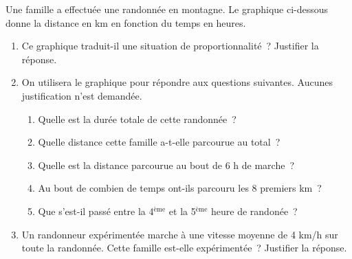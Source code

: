 \documentclass[exercice]{thedocument}%
\begin{document}
%
\begin{minipage}[c]{.35\linewidth}
    Une famille a effectuée une randonnée en montagne. Le graphique ci-dessous
    donne la distance en km en fonction du temps en heures.\smallskip\par\noindent
\end{minipage}
\begin{enumerate}
    \item Ce graphique traduit-il une situation de proportionnalité~? Justifier la réponse.
    \item On utilisera le graphique pour répondre aux questions suivantes.
    Aucunes justification n'est demandée.
    \begin{enumerate}
        \item Quelle est la durée totale de cette randonnée~?
        \item Quelle distance cette famille a-t-elle parcourue au total~?
        \item Quelle est la distance parcourue au bout de 6 h de marche~?
        \item Au bout de combien de temps ont-ils parcouru les 8 premiers km~?
        \item Que s'est-il passé entre la 4$^{\text{ème}}$ et la 5$^{\text{ème}}$ heure de randonée~?
    \end{enumerate} 
    \item Un randonneur expérimentée marche à une vitesse moyenne de 4 km/h sur
    toute la randonnée. Cette famille est-elle expérimentée~? Justifier la réponse.
\end{enumerate}
\showthesource
\end{document}
